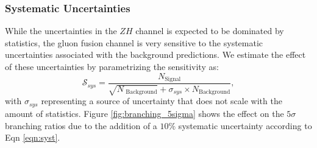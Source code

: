 
\subsubsection{Systematic Uncertainties}

While the uncertainties in the $ZH$ channel is expected to be dominated by statistics, the gluon fusion channel is very sensitive to the systematic uncertainties associated with the background predictions. We estimate the effect of these uncertainties by parametrizing the sensitivity as:
%
\begin{equation}
\mathcal{S}_{sys} = \frac{N_\text{Signal}}{\sqrt{N_\text{ Background}}+\sigma_{sys}\times N_\text{Background}},
\label{eqn:syst}
\end{equation}
%
with $\sigma_{sys}$ representing a source of uncertainty that does not scale with the amount of statistics.
%
Figure \ref{fig:branching_5sigma} shows the effect on the $5\sigma$ branching ratios due to the addition of a $10\%$ systematic uncertainty according to Eqn \ref{eqn:syst}.

